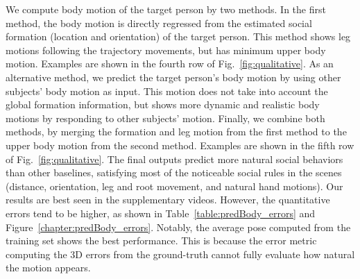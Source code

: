 We compute body motion of the target person by two methods. In the first method, the body motion is directly regressed from the estimated social formation (location and orientation) of the target person. This method shows leg motions following the trajectory movements, but has minimum upper body motion. Examples are shown in the fourth row of Fig.~\ref{fig:qualitative}. As an alternative method, we predict the target person's body motion by using other subjects' body motion as input. This motion does not take into account the global formation information, but shows more dynamic and realistic body motions by responding to other subjects' motion. Finally, we combine both methods, by merging the formation and leg motion from the first method to the upper body motion from the second method. Examples are shown in the fifth row of Fig.~\ref{fig:qualitative}. The final outputs predict more natural social behaviors than other baselines, satisfying most of the noticeable social rules in the scenes (distance, orientation, leg and root movement, and natural hand motions). Our results are best seen in the supplementary videos. However, the quantitative errors tend to be higher, as shown in Table~\ref{table:predBody_errors} and Figure~\ref{chapter:predBody_errors}. Notably, the average pose computed from the training set shows the best performance. This is because the error metric computing the 3D errors from the ground-truth cannot fully evaluate how natural the motion appears. %












